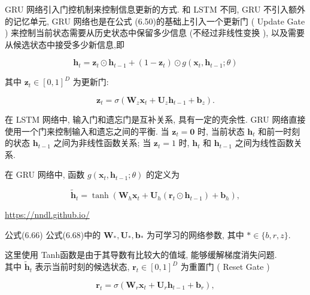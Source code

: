 \documentclass[10pt]{article}
\begin{document}
GRU 网络引入门控机制来控制信息更新的方式. 和 LSTM 不同, GRU 不引入额外的记忆单元, GRU 网络也是在公式 (6.50)的基础上引入一个更新门 ( Update Gate ) 来控制当前状态需要从历史状态中保留多少信息 (不经过非线性变换 ), 以及需要从候选状态中接受多少新信息,即


\begin{equation*}
\boldsymbol{h}_{t}=\boldsymbol{z}_{t} \odot \boldsymbol{h}_{t-1}+\left(1-\boldsymbol{z}_{t}\right) \odot g\left(\boldsymbol{x}_{t}, \boldsymbol{h}_{t-1} ; \theta\right) \tag{6.65}
\end{equation*}


其中 $\boldsymbol{z}_{t} \in[0,1]^{D}$ 为更新门:


\begin{equation*}
\boldsymbol{z}_{t}=\sigma\left(\boldsymbol{W}_{z} \boldsymbol{x}_{t}+\boldsymbol{U}_{z} \boldsymbol{h}_{t-1}+\boldsymbol{b}_{z}\right) . \tag{6.66}
\end{equation*}


在 LSTM 网络中, 输入门和遗忘门是互补关系, 具有一定的壳余性. GRU 网络直接使用一个门来控制输入和遗忘之间的平衡. 当 $\boldsymbol{z}_{t}=\mathbf{0}$ 时, 当前状态 $\boldsymbol{h}_{t}$ 和前一时刻的状态 $\boldsymbol{h}_{t-1}$ 之间为非线性函数关系; 当 $\boldsymbol{z}_{t}=1$ 时, $\boldsymbol{h}_{t}$ 和 $\boldsymbol{h}_{t-1}$ 之间为线性函数关系.

在 GRU 网络中, 函数 $g\left(\boldsymbol{x}_{t}, \boldsymbol{h}_{t-1} ; \theta\right)$ 的定义为


\begin{equation*}
\tilde{\boldsymbol{h}}_{t}=\tanh \left(\boldsymbol{W}_{h} \boldsymbol{x}_{t}+\boldsymbol{U}_{h}\left(\boldsymbol{r}_{t} \odot \boldsymbol{h}_{t-1}\right)+\boldsymbol{b}_{h}\right), \tag{6.67}
\end{equation*}


\href{https://nndl.github.io/}{https://nndl.github.io/}

公式(6.66) 公式(6.68)中的 $\boldsymbol{W}_{*}, \boldsymbol{U}_{*}, \boldsymbol{b}_{*}$ 为可学习的网络参数, 其中 $* \in\{b, r, z\}$.

这里使用 Tanh函数是由于其导数有比较大的值域, 能够缓解梯度消失问题.\\
其中 $\tilde{\boldsymbol{h}}_{t}$ 表示当前时刻的候选状态, $\boldsymbol{r}_{t} \in[0,1]^{D}$ 为重置门 ( Reset Gate )


\begin{equation*}
\boldsymbol{r}_{t}=\sigma\left(\boldsymbol{W}_{r} \boldsymbol{x}_{t}+\boldsymbol{U}_{r} \boldsymbol{h}_{t-1}+\boldsymbol{b}_{r}\right), \tag{6.68}
\end{equation*}
\end{document}
